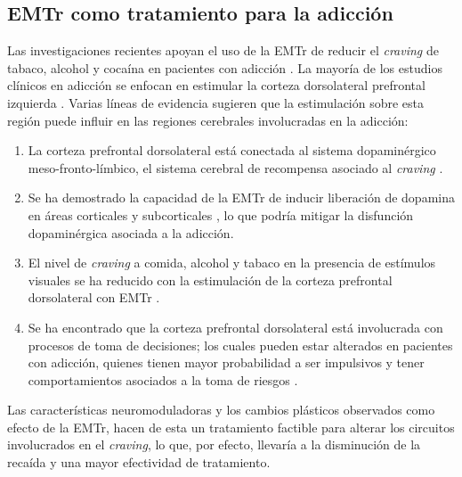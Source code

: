 \subsection{EMTr como tratamiento para la adicción}
Las investigaciones recientes apoyan el uso de la EMTr de reducir el \textit{craving} de tabaco, alcohol y cocaína en pacientes con adicción \parencite{Barr2011}.
La mayoría de los estudios clínicos en adicción se enfocan en estimular la corteza dorsolateral prefrontal izquierda \parencite{Bellamoli2014a,Barr2011,Ekhtiari2019}.
Varias líneas de evidencia sugieren que la estimulación sobre esta región puede influir en las regiones cerebrales involucradas en la adicción:
\begin{enumerate}
    \item La corteza prefrontal dorsolateral está conectada al sistema dopaminérgico meso-fronto-límbico, el sistema cerebral de recompensa asociado al \textit{craving} \parencite{Barr2011}.
    \item Se ha demostrado la capacidad de la EMTr de inducir liberación de dopamina en áreas corticales y subcorticales \parencite{Cho2009,Strafella2001}, lo que podría mitigar la disfunción dopaminérgica asociada a la adicción.
    \item El nivel de \textit{craving} a comida, alcohol y tabaco en la presencia de estímulos visuales se ha reducido con la estimulación de la corteza prefrontal dorsolateral con EMTr \parencite{Amiaz2009}.
    \item Se ha encontrado que la corteza prefrontal dorsolateral está involucrada con procesos de toma de decisiones; los cuales pueden estar alterados en pacientes con adicción, quienes tienen mayor probabilidad a ser impulsivos y tener comportamientos asociados a la toma de riesgos \parencite{Barr2011}.
\end{enumerate}
Las características neuromoduladoras y los cambios plásticos observados como efecto de la EMTr, hacen de esta un tratamiento factible para alterar los circuitos involucrados en el \textit{craving}, lo que, por efecto, llevaría a la disminución de la recaída y una mayor efectividad de tratamiento.

